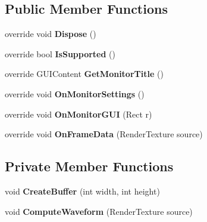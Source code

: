 \subsection*{Public Member Functions}
\begin{DoxyCompactItemize}
\item 
\mbox{\label{class_unity_editor_1_1_post_processing_1_1_waveform_monitor_aa30204365ee9ccf878ecd5e5dafd06d8}} 
override void {\bfseries Dispose} ()
\item 
\mbox{\label{class_unity_editor_1_1_post_processing_1_1_waveform_monitor_aa2c30e921275f59d61d0f50d3804a306}} 
override bool {\bfseries Is\+Supported} ()
\item 
\mbox{\label{class_unity_editor_1_1_post_processing_1_1_waveform_monitor_a71cc6ab9e9d57a73451cdb0e86d25b79}} 
override G\+U\+I\+Content {\bfseries Get\+Monitor\+Title} ()
\item 
\mbox{\label{class_unity_editor_1_1_post_processing_1_1_waveform_monitor_a68311f67e6546f64f01f825bd0cdff5a}} 
override void {\bfseries On\+Monitor\+Settings} ()
\item 
\mbox{\label{class_unity_editor_1_1_post_processing_1_1_waveform_monitor_acdc2fa129a9020c11b49e4ed3c47f80d}} 
override void {\bfseries On\+Monitor\+G\+UI} (Rect r)
\item 
\mbox{\label{class_unity_editor_1_1_post_processing_1_1_waveform_monitor_a8a2597c0eedeeb0f5451ca10edc1c241}} 
override void {\bfseries On\+Frame\+Data} (Render\+Texture source)
\end{DoxyCompactItemize}
\subsection*{Private Member Functions}
\begin{DoxyCompactItemize}
\item 
\mbox{\label{class_unity_editor_1_1_post_processing_1_1_waveform_monitor_a231d458632678a14b479dee94ce7c274}} 
void {\bfseries Create\+Buffer} (int width, int height)
\item 
\mbox{\label{class_unity_editor_1_1_post_processing_1_1_waveform_monitor_a5362ee75bf8b2e9116125d6e33d61acd}} 
void {\bfseries Compute\+Waveform} (Render\+Texture source)
\end{DoxyCompactItemize}
